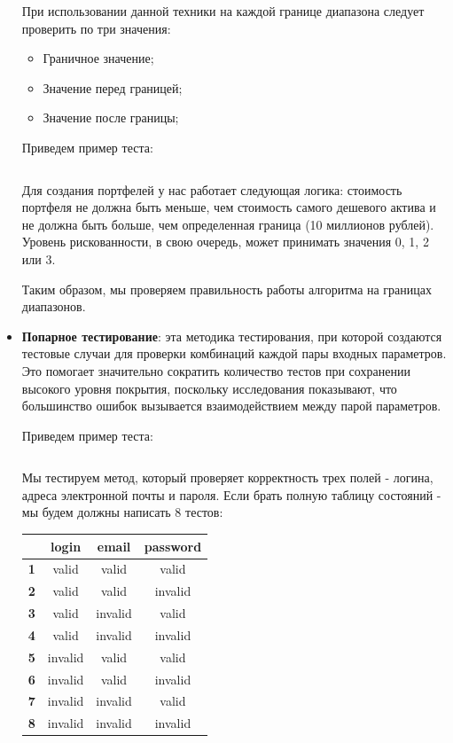 \documentclass[a4paper, 14pt]{article}
\begin{document}
\begin{itemize}
    При использовании данной техники на каждой границе диапазона следует проверить по три значения:
    \begin{itemize}
        \item Граничное значение;
        \item Значение перед границей;
        \item Значение после границы;
    \end{itemize}

    Приведем пример теста:
    \small
    \inputminted[frame=single]{java}{./code/3.java}
    \large

    Для создания портфелей у нас работает следующая логика: стоимость портфеля не должна быть меньше, чем стоимость самого дешевого актива и не должна быть больше, чем определенная граница (10 миллионов рублей). Уровень рискованности, в свою очередь, может принимать значения 0, 1, 2 или 3.

    Таким образом, мы проверяем правильность работы алгоритма на границах диапазонов.

    \item \textbf{Попарное тестирование}: эта методика тестирования, при которой создаются тестовые случаи для проверки комбинаций каждой пары входных параметров. Это помогает значительно сократить количество тестов при сохранении высокого уровня покрытия, поскольку исследования показывают, что большинство ошибок вызывается взаимодействием между парой параметров.

    Приведем пример теста:
    \normalsize
    \inputminted[frame=single]{java}{./code/4.java}
    \large

    Мы тестируем метод, который проверяет корректность трех полей - логина, адреса электронной почты и пароля. Если брать полную таблицу состояний - мы будем должны написать 8 тестов:

    \begin{table}[H]
        \centering
        \begin{tabular}{|c|c|c|c|}
        \hline
        \textbf{}  & \textbf{login} & \textbf{email} & \textbf{password} \\ \hline
        \textbf{1} & valid          & valid          & valid             \\ \hline
        \textbf{2} & valid          & valid          & invalid           \\ \hline
        \textbf{3} & valid          & invalid        & valid             \\ \hline
        \textbf{4} & valid          & invalid        & invalid           \\ \hline
        \textbf{5} & invalid        & valid          & valid             \\ \hline
        \textbf{6} & invalid        & valid          & invalid           \\ \hline
        \textbf{7} & invalid        & invalid        & valid             \\ \hline
        \textbf{8} & invalid        & invalid        & invalid           \\ \hline
        \end{tabular}
    \end{table}


\end{itemize}
\end{document}
